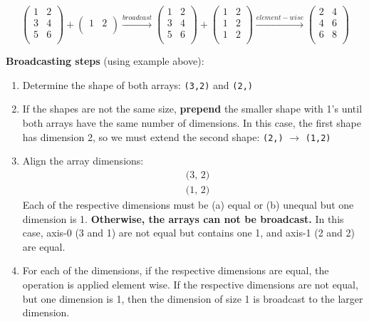 \documentclass[12pt]{article}
\numberwithin{equation}{section}
\begin{document}
\begin{equation*}
    \begin{pmatrix}
        1 & 2\\
        3 & 4\\
        5 & 6\\
    \end{pmatrix}
    +
    \begin{pmatrix}
        1 & 2\\
    \end{pmatrix}
    \xrightarrow{broadcast }
    \begin{pmatrix}
        1 & 2\\
        3 & 4\\
        5 & 6\\
    \end{pmatrix}
    +
    \begin{pmatrix}
        1 & 2\\
        1 & 2\\
        1 & 2\\
    \end{pmatrix}
    \xrightarrow{element-wise }
	\begin{pmatrix}
		2 & 4\\
		4 & 6\\
		6 & 8\\
	\end{pmatrix}
\end{equation*}

\textbf{Broadcasting steps} (using example above):
\begin{enumerate}
    \item Determine the shape of both arrays: \verb|(3,2)| and \verb|(2,)|
    \item If the shapes are not the same size, \textbf{prepend} the smaller shape with 1's until both arrays have the same number of dimensions. In this case, the first shape has dimension 2, so we must extend the second shape: \verb|(2,)| $\rightarrow$ \verb|(1,2)|
    \item Align the array dimensions:
    \begin{align*}
        &\text{(3, 2)}\\
        &\text{(1, 2)}
    \end{align*}
    Each of the respective dimensions must be (a) equal or (b) unequal but one dimension is 1. \textbf{Otherwise, the arrays can not be broadcast.} In this case, axis-0 (3 and 1) are not equal but contains one 1, and axis-1 (2 and 2) are equal.
    \item For each of the dimensions, if the respective dimensions are equal, the operation is applied element wise. If the respective dimensions are not equal, but one dimension is 1, then the dimension of size 1 is broadcast to the larger dimension.
\end{enumerate}
\end{document}
